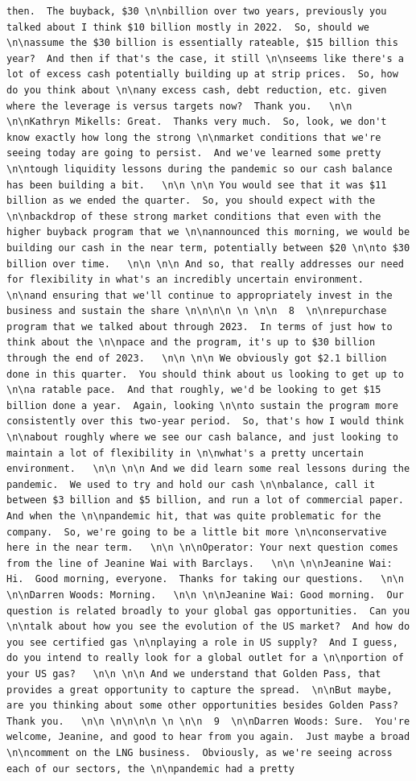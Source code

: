 \documentclass[
  letterpaper,
  DIV=11,
  numbers=noendperiod]{scrreprt}
\begin{document}
\begin{verbatim}
then.  The buyback, $30 \n\nbillion over two years, previously you talked about I think $10 billion mostly in 2022.  So, should we \n\nassume the $30 billion is essentially rateable, $15 billion this year?  And then if that's the case, it still \n\nseems like there's a lot of excess cash potentially building up at strip prices.  So, how do you think about \n\nany excess cash, debt reduction, etc. given where the leverage is versus targets now?  Thank you.   \n\n \n\nKathryn Mikells: Great.  Thanks very much.  So, look, we don't know exactly how long the strong \n\nmarket conditions that we're seeing today are going to persist.  And we've learned some pretty \n\ntough liquidity lessons during the pandemic so our cash balance has been building a bit.   \n\n \n\n You would see that it was $11 billion as we ended the quarter.  So, you should expect with the \n\nbackdrop of these strong market conditions that even with the higher buyback program that we \n\nannounced this morning, we would be building our cash in the near term, potentially between $20 \n\nto $30 billion over time.   \n\n \n\n And so, that really addresses our need for flexibility in what's an incredibly uncertain environment.  \n\nand ensuring that we'll continue to appropriately invest in the business and sustain the share \n\n\n\n \n \n\n  8  \n\nrepurchase program that we talked about through 2023.  In terms of just how to think about the \n\npace and the program, it's up to $30 billion through the end of 2023.   \n\n \n\n We obviously got $2.1 billion done in this quarter.  You should think about us looking to get up to \n\na ratable pace.  And that roughly, we'd be looking to get $15 billion done a year.  Again, looking \n\nto sustain the program more consistently over this two-year period.  So, that's how I would think \n\nabout roughly where we see our cash balance, and just looking to maintain a lot of flexibility in \n\nwhat's a pretty uncertain environment.   \n\n \n\n And we did learn some real lessons during the pandemic.  We used to try and hold our cash \n\nbalance, call it between $3 billion and $5 billion, and run a lot of commercial paper.  And when the \n\npandemic hit, that was quite problematic for the company.  So, we're going to be a little bit more \n\nconservative here in the near term.   \n\n \n\nOperator: Your next question comes from the line of Jeanine Wai with Barclays.   \n\n \n\nJeanine Wai: Hi.  Good morning, everyone.  Thanks for taking our questions.   \n\n \n\nDarren Woods: Morning.   \n\n \n\nJeanine Wai: Good morning.  Our question is related broadly to your global gas opportunities.  Can you \n\ntalk about how you see the evolution of the US market?  And how do you see certified gas \n\nplaying a role in US supply?  And I guess, do you intend to really look for a global outlet for a \n\nportion of your US gas?   \n\n \n\n And we understand that Golden Pass, that provides a great opportunity to capture the spread.  \n\nBut maybe, are you thinking about some other opportunities besides Golden Pass?  Thank you.   \n\n \n\n\n\n \n \n\n  9  \n\nDarren Woods: Sure.  You're welcome, Jeanine, and good to hear from you again.  Just maybe a broad \n\ncomment on the LNG business.  Obviously, as we're seeing across each of our sectors, the \n\npandemic had a pretty 
\end{verbatim}
\end{document}
